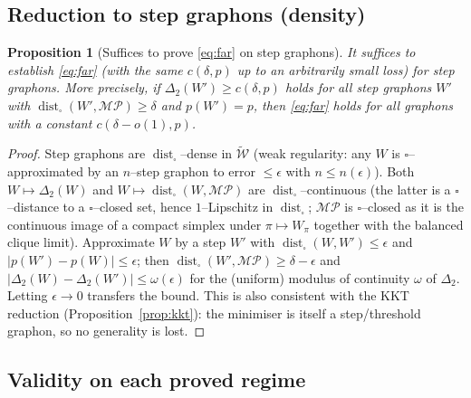 \documentclass[11pt]{article}
\newtheorem{proposition}[theorem]{Proposition}
\theoremstyle{definition}
\newcommand{\dist}{\operatorname{dist}}
\newcommand{\MP}{\mathcal{MP}}
\begin{document}
\subsection{Reduction to step graphons (density)}

\begin{proposition}[Suffices to prove \eqref{eq:far} on step graphons]\label{prop:densify}
It suffices to establish \eqref{eq:far} (with the same $c(\delta,p)$ up to an
arbitrarily small loss) for step graphons.  More precisely, if
$\Delta_2(W')\ge c(\delta,p)$ holds for all \emph{step} graphons $W'$ with
$\dist_\square(W',\MP)\ge\delta$ and $p(W')=p$, then \eqref{eq:far} holds for all
graphons with a constant $c(\delta-o(1),p)$.
\end{proposition}
\begin{proof}
Step graphons are $\dist_\square$--dense in $\widetilde{\mathcal W}$ (weak
regularity: any $W$ is $\square$--approximated by an $n$--step graphon to error
$\le\epsilon$ with $n\le n(\epsilon)$).  Both $W\mapsto\Delta_2(W)$ and
$W\mapsto\dist_\square(W,\MP)$ are $\dist_\square$--continuous (the latter is a
$\square$--distance to a $\square$--closed set, hence $1$--Lipschitz in
$\dist_\square$; $\MP$ is $\square$--closed as it is the continuous image of a
compact simplex under $\pi\mapsto W_\pi$ together with the balanced clique limit).
Approximate $W$ by a step $W'$ with $\dist_\square(W,W')\le\epsilon$ and
$|p(W')-p(W)|\le\epsilon$; then $\dist_\square(W',\MP)\ge\delta-\epsilon$ and
$|\Delta_2(W)-\Delta_2(W')|\le\omega(\epsilon)$ for the (uniform) modulus of
continuity $\omega$ of $\Delta_2$.  Letting $\epsilon\to0$ transfers the bound.
This is also consistent with the KKT reduction (Proposition~\ref{prop:kkt}): the
minimiser is itself a step/threshold graphon, so no generality is lost.
\end{proof}

\subsection{Validity on each proved regime}
\end{document}
